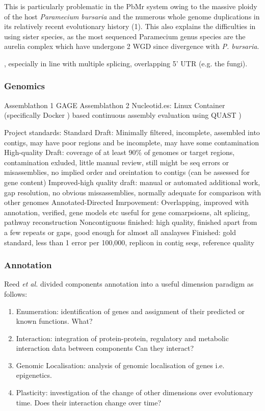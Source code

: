 This is particularly problematic in the PbMr system owing to the massive
ploidy of the host \textit{Paramecium bursaria} and the numerous whole genome
duplications in its relatively recent evolutionary history (1).  This also 
explains the difficulties in using sister species, as the most sequenced Paramecium
genus species are the aurelia complex which have undergone 2 WGD since divergence with
\textit{P. bursaria}.

, especially in line with multiple splicing, overlapping 5' UTR (e.g.
the fungi).




\subsubsection{Genomics}

Assemblathon 1 \citep{Earl2011}
GAGE \citep{Schatz2012}
Assemblathon 2 \citep{Bradnam2013}
Nucleotid.es: Linux Container (specifically Docker \citep{Merkel2014})  based continuous assembly evaluation using QUAST \citep{Gurevich2013a})


Project standards:
Standard Draft: Minimally filtered, incomplete, assembled into contigs, may have poor regions and be incomplete, may have some contamination
High-quality Draft: coverage of at least 90\% of genomes or target regions, contamination exluded, little manual review, still might be seq errors or misassemblies, no implied order and oreintation to contigs (can be assessed for gene content)
Improved-high quality draft: manual or automated additional work, gap resolution, no obvious missassemblies, normally adequate for comparison with other genomes
Annotated-Directed Imrpovement: Overlapping, improved with annotation, verified, gene models etc useful for gene comarpsiosns, alt splicing, pathway reconstruction
Noncontiguous finished: high quality, finished apart from a few repeats or gaps, good enough for almost all analayses
Finished: gold standard, less than 1 error per 100,000, replicon in contig seqs, reference quality \citep{Chain2009}




\subsubsection{Annotation}

Reed \textit{et al.} \citep{Reed2006} divided components annotation into a useful dimension paradigm as follows:
\begin{enumerate}
    \item Enumeration: identification of genes and assignment of their predicted or known functions. What?
    \item Interaction: integration of protein-protein, regulatory and metabolic interaction data between components Can they interact?
    \item Genomic Localisation: analysis of genomic localisation of genes i.e. epigenetics.
    \item Plasticity: investigation of the change of other dimensions over evolutionary time. Does their interaction change over time? \citep{Reed2006} 
\end{enumerate}

